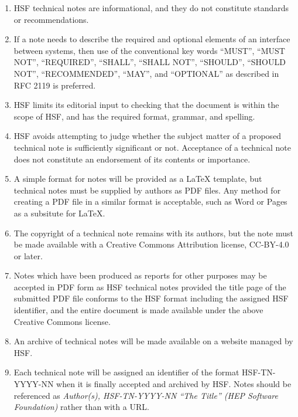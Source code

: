 \documentclass[12pt,a4paper]{article}
\begin{document}
\begin{enumerate}

\item HSF technical notes are informational, and they do not
constitute standards or recommendations. 

\item If a note needs to describe the required and optional elements of an interface between systems,
then use of the conventional key words 
``MUST'', 
``MUST NOT'', 
``REQUIRED'', 
``SHALL'', 
``SHALL NOT'', 
``SHOULD'', 
``SHOULD NOT'', 
``RECOMMENDED'', 
``MAY'', and      
``OPTIONAL''
as described in RFC 2119\cite{SHOULD-MUST} is preferred.

\item HSF limits its editorial input to checking that the document is within the
scope of HSF, and has the required format, grammar, and spelling.

\item HSF avoids attempting to judge whether the subject matter of a proposed technical 
note is sufficiently significant or not. Acceptance of a technical note
does not constitute an endorsement of its contents or importance.

\item A simple format for notes will be provided as a LaTeX template, but technical
notes must be supplied by authors as PDF files. Any method for creating a PDF file in
a similar format is acceptable, such as Word or Pages as a subsitute for 
LaTeX.

\item The copyright of a technical note remains with its authors, but the note
must be made available with a Creative Commons Attribution license, 
CC-BY-4.0 or later.

\item Notes which have been produced as reports for other purposes may be 
accepted in PDF form as HSF technical notes provided the title page of the
submitted PDF file conforms
to the HSF format including the assigned HSF identifier, and the entire document
is made available under the above Creative Commons license.

\item An archive of technical notes will be made available on a website
managed by HSF.

\item Each technical note will be assigned an identifier of the format
HSF-TN-YYYY-NN when it is finally accepted and archived by HSF. Notes should
be referenced as 
{\it Author(s), HSF-TN-YYYY-NN ``The Title'' (HEP Software
Foundation) } rather than with a URL.


\end{enumerate}
\end{document}
